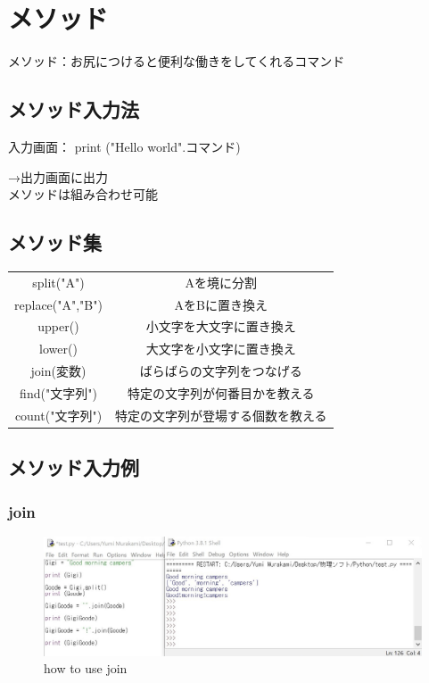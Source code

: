 \documentclass[11pt,a4paper]{jreport}
\begin{document}
\section{メソッド}%
メソッド：お尻につけると便利な働きをしてくれるコマンド
\subsection{メソッド入力法}
入力画面：
print ("Hello world".コマンド)

→出力画面に出力\\

メソッドは組み合わせ可能

\subsection{メソッド集}
\begin{table}[htb]
 \begin{tabular}{cc}
  split("A")       & Aを境に分割                        \\
  replace("A","B") & AをBに置き換え                     \\
  upper()          & 小文字を大文字に置き換え           \\
  lower()          & 大文字を小文字に置き換え           \\
  join(変数)       & ばらばらの文字列をつなげる         \\
  find("文字列")   & 特定の文字列が何番目かを教える     \\
  count("文字列")  & 特定の文字列が登場する個数を教える
 \end{tabular}

\end{table}

\subsection{メソッド入力例}
\subsubsection{join}

\begin{figure}[htbp]
 \begin{center}
  \includegraphics[clip,width=13.0cm]{how_to_use_join.jpg}
  \caption{how to use join}
  \label{join}
 \end{center}
\end{figure}
\end{document}
